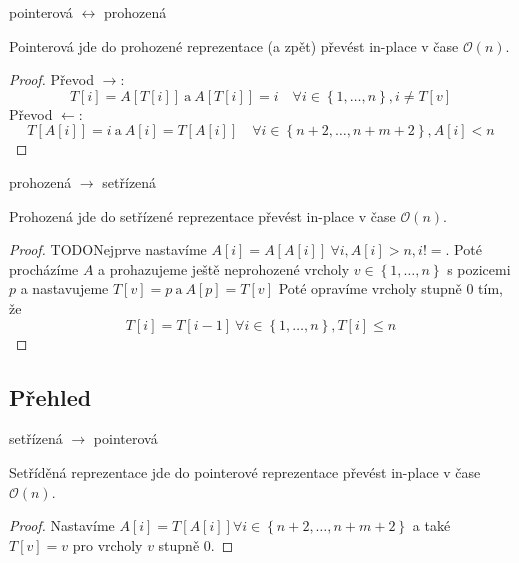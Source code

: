 \documentclass{beamer}
\begin{document}
	\begin{frame}{pointerová $\longleftrightarrow$ prohozená}
		\begin{lemma}
			Pointerová jde do prohozené reprezentace (a zpět) převést in-place v čase $\mathcal{O}\left(n\right)$.
		\end{lemma}

		\begin{proof}
			Převod $\rightarrow$: $$T[i] = A[T[i]]\ \text{a}\ A[T[i]] = i\quad \forall i \in \left\{1, \ldots, n\right\}, i \neq T[v]$$
			Převod $\leftarrow$: $$T[A[i]] = i\ \text{a}\ A[i] = T[A[i]]\quad \forall i \in \left\{n + 2, \ldots, n + m + 2\right\}, A[i] < n$$
		\end{proof}
	\end{frame}

	\begin{frame}{prohozená $\rightarrow$ setřízená}
		\begin{lemma}
			Prohozená jde do setřízené reprezentace převést in-place v čase $\mathcal{O}\left(n\right)$.
		\end{lemma}

		\begin{proof}
			TODONejprve nastavíme $A[i] = A[A[i]]\ \forall i, A[i] > n, i !=$.
			\vfill
			Poté procházíme $A$ a prohazujeme ještě neprohozené vrcholy $v \in \left\{1, \ldots, n\right\}$ s pozicemi $p$ a nastavujeme $T[v] = p\ \text{a}\ A[p] = T[v]$
			Poté opravíme vrcholy stupně $0$ tím, že 
			$$T[i] = T[i - 1]\ \forall i \in \left\{1, \ldots, n\right\}, T[i] \le n$$

		\end{proof}
	\end{frame}

	\subsection{Přehled}
	\begin{frame}{setřízená $\rightarrow$ pointerová}
		\begin{lemma}
			Setříděná reprezentace jde do pointerové reprezentace převést in-place v čase $\mathcal{O}\left(n\right)$.
		\end{lemma}

		\begin{proof}
			Nastavíme $A[i] = T\left[A\left[i\right]\right] \forall i \in \left\{n + 2, \ldots, n + m + 2\right\}$ a také $T\left[v\right] = v$ pro vrcholy $v$ stupně $0$.
		\end{proof}
	\end{frame}
\end{document}
